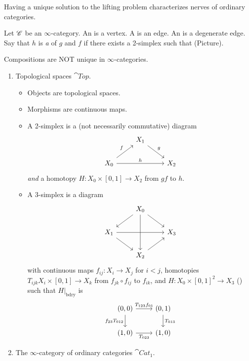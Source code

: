 \begin{remark}
	Having a unique solution to the lifting problem characterizes nerves of ordinary categories.
\end{remark}
\begin{definition}
	Let $\mathscr C$ be an $\infty$-category. An  is a vertex. A  is an
	edge. An  is a degenerate edge. Say that $h$ is \emph{a}
	 of $g$ and $f$ if there exists a 2-simplex such that (Picture).
\end{definition}
\begin{remark}
	Compositions are NOT unique in $\infty$-categories.
\end{remark}
\begin{example} \leavevmode
\begin{enumerate}[1)]
	\item Topological spaces $\cat{Top}$.
		\begin{itemize}
			\item Objects are topological spaces.
			\item Morphisms are continuous maps.
			\item A 2-simplex is a (not necessarily commutative) diagram
				\[
					\begin{tikzcd}
						& X_1 \ar[dr,"g"] \\
						X_0 \ar[ur,"f"] \ar[rr,"h"] & & X_2
					\end{tikzcd}
				\]
				\emph{and} a homotopy $H:X_0\times [0,1]\to X_2$ from $gf$ to $h$.
			\item A 3-simplex is a diagram
				\[
					\begin{tikzcd}
						& X_0 \ar[dl] \ar[dr] \ar[dd] \\
						X_1 \ar[rr] \ar[dr] & & X_3 \\
						& X_2 \ar[ur]
					\end{tikzcd}
				\]
				with continuous maps $f_{ij}:X_i\to X_j$ for $i<j$, homotopies $T_{ijk}X_i\times
				[0,1]\to X_k$ from $f_{jk}\circ f_{ij}$ to $f_{ik}$, and $H:X_0\times [0,1]^2\to X_3$
				() such that $H|_{\text{bdry}}$ is
				\[
					\begin{tikzcd}
						(0,0) \ar[r,"T_{123}f_{01}"] \ar[d,"f_{23}T_{012}"'] & (0,1) \ar[d,"T_{013}"] \\
						(1,0) \ar[r,"T_{023}"'] & (1,0)
					\end{tikzcd}
				\]
		\end{itemize}
	\item The $\infty$-category of ordinary categories $\cat{Cat}_1$.

\end{enumerate}
\end{example}
